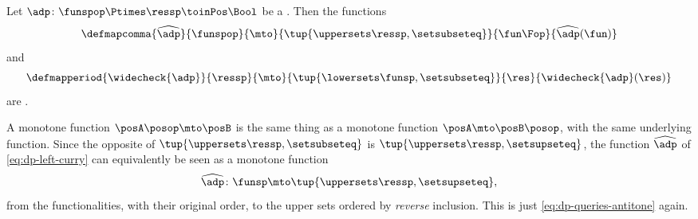 \begin{lemma}
    \label{lem:dp-currying-monotone}
    Let $\adp \colon \funspop \Ptimes \ressp \toinPos \Bool$ be a .
    Then the functions
    \begin{equation}\label{eq:dp-left-curry}
        \defmapcomma{
            \widehat{\adp}
        }{
            \funspop
        }{
            \mto
        }{
            \tup{\uppersets \ressp, \setsubseteq}
        }{
            \fun\Fop
        }{
            \widehat{\adp}(\fun)
        }
    \end{equation}
    and
    \begin{equation}\label{eq:dp-right-curry}
        \defmapperiod{
            \widecheck{\adp}
        }{
            \ressp
        }{
            \mto
        }{
            \tup{\lowersets \funsp, \setsubseteq}
        }{
            \res
        }{
            \widecheck{\adp}(\res)
        }
    \end{equation}
    are .
\end{lemma}

\begin{remark}
    \label{rem:dp-curry-other-form}
    A monotone function $\posA\posop \mto \posB$ is the same thing as a monotone function $\posA \mto \posB\posop$, with the same underlying function.
    Since the opposite of $\tup{\uppersets \ressp, \setsubseteq}$ is $\tup{\uppersets \ressp, \setsupseteq}$, the function $\widehat{\adp}$ of \cref{eq:dp-left-curry} can equivalently be seen as a monotone function
    \begin{equation}
        \widehat{\adp} \colon \funsp \mto \tup{\uppersets \ressp, \setsupseteq},
    \end{equation}
    from the functionalities, with their original order, to the upper sets ordered by \emph{reverse} inclusion.
    This is just \cref{eq:dp-queries-antitone} again.
\end{remark}


